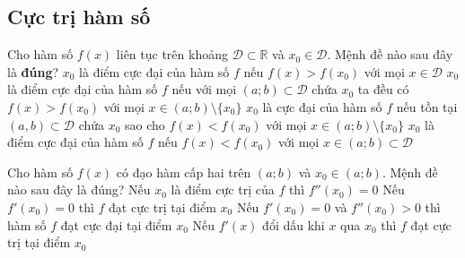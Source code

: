 \subsection{Cực trị hàm số}
\begin{ex}%
	Cho hàm số $f(x)$ liên tục trên khoảng $\mathscr{\mathscr{D}}\subset\mathbb{R}$ và $x_0\in \mathscr{\mathscr{D}}$. Mệnh đề nào sau đây là \textbf{đúng}?
	\choice
	{$x_0$ là điểm cực đại của hàm số $f$ nếu $f(x)>f(x_0)$ với mọi $x\in \mathscr{D}$}
	{$x_0$ là điểm cực đại của hàm số $f$ nếu với mọi $(a;b)\subset \mathscr{D}$ chứa $x_0$ ta đều có $f(x)>f(x_0)$ với mọi $x\in (a;b)\setminus\{x_0\}$}
	{\True $x_0$ là cực đại của hàm số $f$ nếu tồn tại $(a,b)\subset \mathscr{D}$ chứa $x_0$ sao cho $f(x)<f(x_0)$ với mọi $x\in(a;b)\setminus\{x_0\}$}
	{$x_0$ là điểm cực đại của hàm số $f$ nếu $f(x)<f(x_0)$ với mọi $x\in (a;b)\subset \mathscr{D}$}
\end{ex}

\begin{ex}%
	Cho hàm số $f(x)$ có đạo hàm cấp hai trên $(a;b)$ và $x_0\in (a;b)$. Mệnh đề nào sau đây là đúng?
	\choice
	{Nếu $x_0$ là điểm cực trị của $f$ thì $f''(x_0)=0$}
	{Nếu $f'(x_0)=0$ thì $f$ đạt cực trị tại điểm $x_0$}
	{Nếu $f'(x_0)=0$ và $f''(x_0)>0$ thì hàm số $f$ đạt cực đại tại điểm $x_0$}
	{\True Nếu $f'(x)$ đổi dấu khi $x$ qua $x_0$ thì $f$ đạt cực trị tại điểm $x_0$}
\end{ex}


